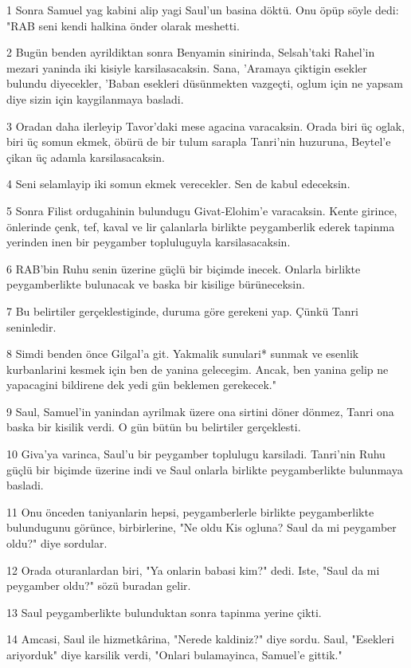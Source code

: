 \par 1 Sonra Samuel yag kabini alip yagi Saul'un basina döktü. Onu öpüp söyle dedi: "RAB seni kendi halkina önder olarak meshetti.
\par 2 Bugün benden ayrildiktan sonra Benyamin sinirinda, Selsah'taki Rahel'in mezari yaninda iki kisiyle karsilasacaksin. Sana, 'Aramaya çiktigin esekler bulundu diyecekler, 'Baban esekleri düsünmekten vazgeçti, oglum için ne yapsam diye sizin için kaygilanmaya basladi.
\par 3 Oradan daha ilerleyip Tavor'daki mese agacina varacaksin. Orada biri üç oglak, biri üç somun ekmek, öbürü de bir tulum sarapla Tanri'nin huzuruna, Beytel'e çikan üç adamla karsilasacaksin.
\par 4 Seni selamlayip iki somun ekmek verecekler. Sen de kabul edeceksin.
\par 5 Sonra Filist ordugahinin bulundugu Givat-Elohim'e varacaksin. Kente girince, önlerinde çenk, tef, kaval ve lir çalanlarla birlikte peygamberlik ederek tapinma yerinden inen bir peygamber topluluguyla karsilasacaksin.
\par 6 RAB'bin Ruhu senin üzerine güçlü bir biçimde inecek. Onlarla birlikte peygamberlikte bulunacak ve baska bir kisilige bürüneceksin.
\par 7 Bu belirtiler gerçeklestiginde, duruma göre gerekeni yap. Çünkü Tanri seninledir.
\par 8 Simdi benden önce Gilgal'a git. Yakmalik sunulari* sunmak ve esenlik kurbanlarini kesmek için ben de yanina gelecegim. Ancak, ben yanina gelip ne yapacagini bildirene dek yedi gün beklemen gerekecek."
\par 9 Saul, Samuel'in yanindan ayrilmak üzere ona sirtini döner dönmez, Tanri ona baska bir kisilik verdi. O gün bütün bu belirtiler gerçeklesti.
\par 10 Giva'ya varinca, Saul'u bir peygamber toplulugu karsiladi. Tanri'nin Ruhu güçlü bir biçimde üzerine indi ve Saul onlarla birlikte peygamberlikte bulunmaya basladi.
\par 11 Onu önceden taniyanlarin hepsi, peygamberlerle birlikte peygamberlikte bulundugunu görünce, birbirlerine, "Ne oldu Kis ogluna? Saul da mi peygamber oldu?" diye sordular.
\par 12 Orada oturanlardan biri, "Ya onlarin babasi kim?" dedi. Iste, "Saul da mi peygamber oldu?" sözü buradan gelir.
\par 13 Saul peygamberlikte bulunduktan sonra tapinma yerine çikti.
\par 14 Amcasi, Saul ile hizmetkârina, "Nerede kaldiniz?" diye sordu. Saul, "Esekleri ariyorduk" diye karsilik verdi, "Onlari bulamayinca, Samuel'e gittik."

